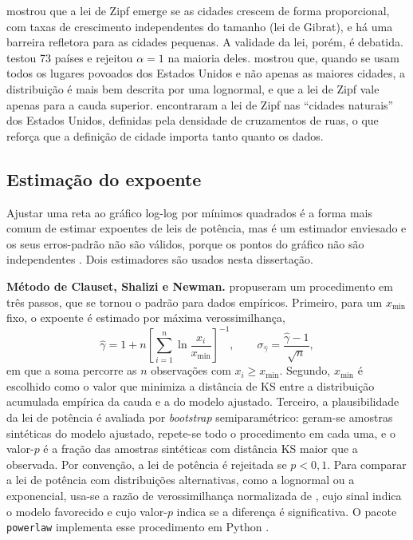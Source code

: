  mostrou que a lei de Zipf emerge se as cidades crescem de forma proporcional, com taxas de crescimento independentes do tamanho (lei de Gibrat), e há uma barreira refletora para as cidades pequenas. A validade da lei, porém, é debatida.  testou 73 países e rejeitou $\alpha = 1$ na maioria deles.  mostrou que, quando se usam todos os lugares povoados dos Estados Unidos e não apenas as maiores cidades, a distribuição é mais bem descrita por uma lognormal, e que a lei de Zipf vale apenas para a cauda superior.  encontraram a lei de Zipf nas ``cidades naturais'' dos Estados Unidos, definidas pela densidade de cruzamentos de ruas, o que reforça que a definição de cidade importa tanto quanto os dados.

\subsection{Estimação do expoente}
\label{sec:estimacao}

Ajustar uma reta ao gráfico log-log por mínimos quadrados é a forma mais comum de estimar expoentes de leis de potência, mas é um estimador enviesado e os seus erros-padrão não são válidos, porque os pontos do gráfico não são independentes \cite{clauset2009}. Dois estimadores são usados nesta dissertação.

\textbf{Método de Clauset, Shalizi e Newman.}  propuseram um procedimento em três passos, que se tornou o padrão para dados empíricos. Primeiro, para um $x_{\min}$ fixo, o expoente é estimado por máxima verossimilhança,
\begin{equation}
	\hat{\gamma} = 1 + n \left[ \sum_{i=1}^{n} \ln \frac{x_i}{x_{\min}} \right]^{-1},
	\qquad \sigma_{\hat{\gamma}} = \frac{\hat{\gamma} - 1}{\sqrt{n}},
	\label{eq:mle}
\end{equation}
em que a soma percorre as $n$ observações com $x_i \geq x_{\min}$. Segundo, $x_{\min}$ é escolhido como o valor que minimiza a distância de \gls{KS} entre a distribuição acumulada empírica da cauda e a do modelo ajustado. Terceiro, a plausibilidade da lei de potência é avaliada por \textit{bootstrap} semiparamétrico: geram-se amostras sintéticas do modelo ajustado, repete-se todo o procedimento em cada uma, e o valor-$p$ é a fração das amostras sintéticas com distância KS maior que a observada. Por convenção, a lei de potência é rejeitada se $p < 0{,}1$. Para comparar a lei de potência com distribuições alternativas, como a lognormal ou a exponencial, usa-se a razão de verossimilhança normalizada de , cujo sinal indica o modelo favorecido e cujo valor-$p$ indica se a diferença é significativa. O pacote \texttt{powerlaw} implementa esse procedimento em Python \cite{alstott2014}.

